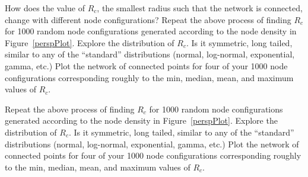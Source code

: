 How does the value of $R_c$, the smallest radius such that the
network is connected, change with different node configurations?
Repeat the above process of finding $R_c$ for 1000 random
node configurations generated according to the node density in
Figure~\ref{perspPlot}. Explore the distribution of $R_c$.
Is it symmetric, long tailed, similar to any of the ``standard''
distributions (normal, log-normal, exponential, gamma, etc.)
Plot the network of connected points for four of your 1000 node
configurations corresponding roughly to the min, median, mean,
and maximum values of $R_c$. 

Repeat the above process of finding $R_c$ for 1000 random
node configurations generated according to the node density in
Figure~\ref{perspPlot}. Explore the distribution of $R_c$.
Is it symmetric, long tailed, similar to any of the ``standard''
distributions (normal, log-normal, exponential, gamma, etc.)
Plot the network of connected points for four of your 1000 node
configurations corresponding roughly to the min, median, mean,
and maximum values of $R_c$. 

 





